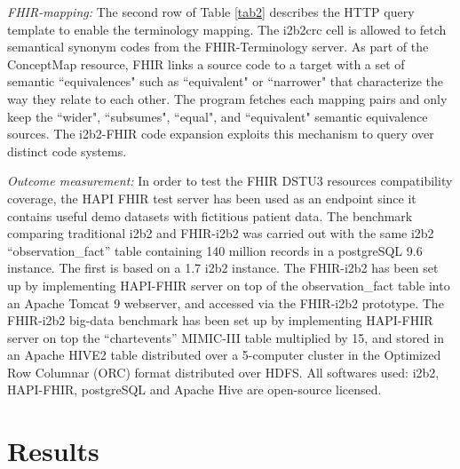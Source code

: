 \documentclass{amia}
\begin{document}
\textit{FHIR-mapping:} The second row of Table \ref{tab2} describes the HTTP query template to enable the terminology mapping. The i2b2crc cell is allowed to fetch semantical synonym codes from the FHIR-Terminology server. As part of the ConceptMap\cite{FHIR} resource, FHIR links a source code to a target with a set of semantic ``equivalences" such as ``equivalent" or ``narrower" that characterize the way they relate to each other. The program fetches each mapping pairs and only keep the ``wider", ``subsumes", ``equal", and ``equivalent" semantic equivalence sources. The i2b2-FHIR code expansion exploits this mechanism to query over distinct code systems.



\textit{Outcome measurement:} In order to test the FHIR DSTU3 resources compatibility coverage, the HAPI FHIR\cite{HAPI} test server has been used as an endpoint since it contains useful demo datasets with fictitious patient data. The benchmark comparing traditional i2b2 and FHIR-i2b2 was carried out with the same i2b2 ``observation\_fact'' table containing 140 million records in a postgreSQL 9.6 instance. The first is based on a 1.7 i2b2 instance. The FHIR-i2b2 has been set up by implementing HAPI-FHIR server on top of the observation\_fact table into an Apache Tomcat 9 webserver, and accessed via the FHIR-i2b2 prototype. The FHIR-i2b2 big-data benchmark has been set up by implementing HAPI-FHIR server on top the ``chartevents'' MIMIC-III\cite{Johnson:SD2016} table multiplied by 15, and stored in an Apache HIVE2 table distributed over a 5-computer cluster in the Optimized Row Columnar (ORC) format distributed over HDFS. All softwares used: i2b2, HAPI-FHIR, postgreSQL and Apache Hive are open-source licensed.

\section*{Results}
\end{document}
